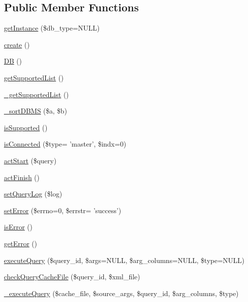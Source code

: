 \subsection*{Public Member Functions}
\begin{DoxyCompactItemize}
\item 
\hyperlink{classDB_a36df3da4b06cd9d45feccb6b82e612c8}{get\-Instance} (\$db\-\_\-type=N\-U\-L\-L)
\item 
\hyperlink{classDB_aad22e845daa75ae9ca9b97f7e3a89749}{create} ()
\item 
\hyperlink{classDB_a29a603c52c10831cddee82518417f992}{D\-B} ()
\item 
\hyperlink{classDB_a82226ac3fc6365c0771b13e389d216cf}{get\-Supported\-List} ()
\item 
\hyperlink{classDB_a7b0d1af98d9f53968631ca789d6d755c}{\-\_\-get\-Supported\-List} ()
\item 
\hyperlink{classDB_ab0a6d97fa16de74b4d991c9a4d633718}{\-\_\-sort\-D\-B\-M\-S} (\$a, \$b)
\item 
\hyperlink{classDB_a7517481bc9d24ad659f8d347688e481b}{is\-Supported} ()
\item 
\hyperlink{classDB_a217cc2096613d1758a9851f1dd990d71}{is\-Connected} (\$type= 'master', \$indx=0)
\item 
\hyperlink{classDB_a51a1ba94763a8211495eac18d74c80bb}{act\-Start} (\$query)
\item 
\hyperlink{classDB_a79cad647912ef780e967819e6346a742}{act\-Finish} ()
\item 
\hyperlink{classDB_a0adb7f453d6e8ed2e491d6708be7f9ec}{set\-Query\-Log} (\$log)
\item 
\hyperlink{classDB_af2584546ee78d07a40cc16493f8797cc}{set\-Error} (\$errno=0, \$errstr= 'success')
\item 
\hyperlink{classDB_ab1433763c6378f1085606424a1bfe27c}{is\-Error} ()
\item 
\hyperlink{classDB_a3956fe8725f824d8c0a4f3cba449d6df}{get\-Error} ()
\item 
\hyperlink{classDB_a4541040cbc3f33b059bafd66f8cb0ada}{execute\-Query} (\$query\-\_\-id, \$args=N\-U\-L\-L, \$arg\-\_\-columns=N\-U\-L\-L, \$type=N\-U\-L\-L)
\item 
\hyperlink{classDB_a0bbeb84cee13c54916b7f9aac6db4791}{check\-Query\-Cache\-File} (\$query\-\_\-id, \$xml\-\_\-file)
\item 
\hyperlink{classDB_abb9920613c642481dc4c7b5f6f8fe9b2}{\-\_\-execute\-Query} (\$cache\-\_\-file, \$source\-\_\-args, \$query\-\_\-id, \$arg\-\_\-columns, \$type)

\end{DoxyCompactItemize}
